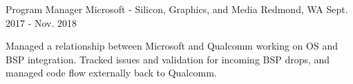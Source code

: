 \begin{cventries}
  \cventry
    {Program Manager} %
    {Microsoft - Silicon, Graphics, and Media} %
    {Redmond, WA} %
    {Sept. 2017 - Nov. 2018} %
    {
      \begin{cvitems} %
      	\item{Managed a relationship between Microsoft and Qualcomm working on OS and BSP integration. Tracked issues and validation for incoming BSP drops, and managed code flow externally back to Qualcomm.}
      \end{cvitems}
    }

\end{cventries}
